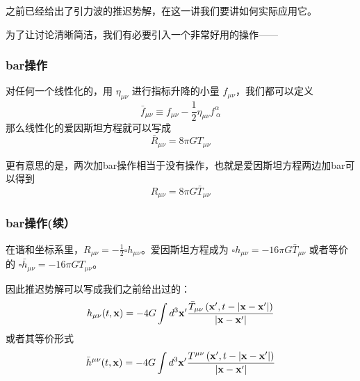 \documentclass[CJK,13pt]{beamer}
\date{}
\begin{document}
  \bch

  \begin{frame}
    之前已经给出了引力波的推迟势解，在这一讲我们要讲如何实际应用它。

    \skiplines

    为了让讨论清晰简洁，我们有必要引入一个非常好用的操作——

    
  \end{frame}
  
  \begin{frame}
    \frametitle{bar操作}
    对任何一个线性化的，用 $\eta_{\mu\nu}$ 进行指标升降的小量 $f_{\mu\nu}$，我们都可以定义
    $$\bar{f}_{\mu\nu} \equiv f_{\mu\nu}-\frac{1}{2}\eta_{\mu\nu} f^{\alpha}_{\ \alpha}$$
    那么线性化的爱因斯坦方程就可以写成
      $$ \bar{R}_{\mu\nu} = 8\pi GT_{\mu\nu}  $$

    \skipline

    更有意思的是，两次加bar操作相当于没有操作，也就是爱因斯坦方程两边加bar可以得到
    $$R_{\mu\nu} = 8\pi G\bar{T}_{\mu\nu}  $$
  \end{frame}


  \begin{frame}
    \frametitle{bar操作(续）}
      在谐和坐标系里，$R_{\mu\nu}=-\frac{1}{2}\square h_{\mu\nu}$。爱因斯坦方程成为
      $\square h_{\mu\nu} = -16\pi G \bar{T}_{\mu\nu}$
      或者等价的
      $\square \bar{h}_{\mu\nu} = -16\pi G T_{\mu\nu}$。

      
      因此推迟势解可以写成我们之前给出过的：
      {\blue $$ h_{\mu\nu}(t, {\mathbf{x}}) = -4G \int d^3{\mathbf{x}}' \frac{\bar{T}_{\mu\nu}\left({\mathbf{x}}', t - \lvert {\mathbf{x}} -{\mathbf{x}}'\rvert\right)}{\lvert {\mathbf{x}} - {\mathbf{x}}'\rvert} $$}
      或者其等价形式
      {\blue $$ \bar{h}^{\mu\nu}(t, {\mathbf{x}}) = -4G \int d^3{\mathbf{x}}' \frac{T^{\mu\nu}\left({\mathbf{x}}', t - \lvert {\mathbf{x}} -{\mathbf{x}}'\rvert\right)}{\lvert {\mathbf{x}} - {\mathbf{x}}'\rvert} $$}
      
  \end{frame}


\end{document}
